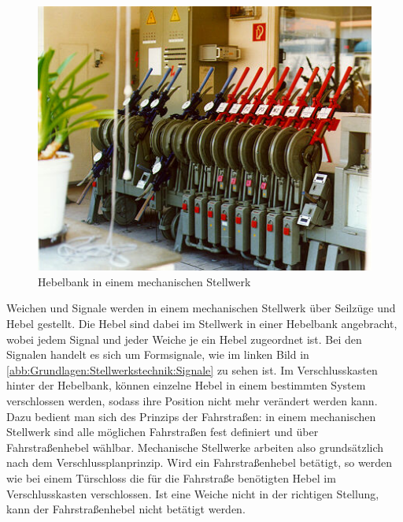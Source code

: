 \begin{figure}[H]
    \centering
    \includegraphics[width=.8\textwidth]{Assets/Images/2-Grundlagen/Mechanisches-Stellwerk-Hebelbank.jpg}
    \caption{Hebelbank in einem mechanischen Stellwerk~\cite{bib:stellwerke.de:Einheit}}\label{abb:Grundlagen:Stellwerkstechnik:Mechanische-Stellwerke:Hebelbank}
\end{figure}

Weichen und Signale werden in einem mechanischen Stellwerk über Seilzüge und Hebel gestellt. Die Hebel sind dabei im Stellwerk in einer Hebelbank angebracht, wobei jedem Signal und jeder Weiche je ein Hebel zugeordnet ist. Bei den Signalen handelt es sich um Formsignale, wie im linken Bild in \autoref{abb:Grundlagen:Stellwerkstechnik:Signale} zu sehen ist.
Im Verschlusskasten hinter der Hebelbank, können einzelne Hebel in einem bestimmten System verschlossen werden, sodass ihre Position nicht mehr verändert werden kann. Dazu bedient man sich des Prinzips der Fahrstraßen: in einem mechanischen Stellwerk sind alle möglichen Fahrstraßen fest definiert und über Fahrstraßenhebel wählbar. Mechanische Stellwerke arbeiten also grundsätzlich nach dem Verschlussplanprinzip. Wird ein Fahrstraßenhebel betätigt, so werden wie bei einem Türschloss die für die Fahrstraße benötigten Hebel im Verschlusskasten verschlossen. Ist eine Weiche nicht in der richtigen Stellung, kann der Fahrstraßenhebel nicht betätigt werden.~\cite[][S.173 ff.]{bib:Sicherung-des-Schienenverkehrs}

